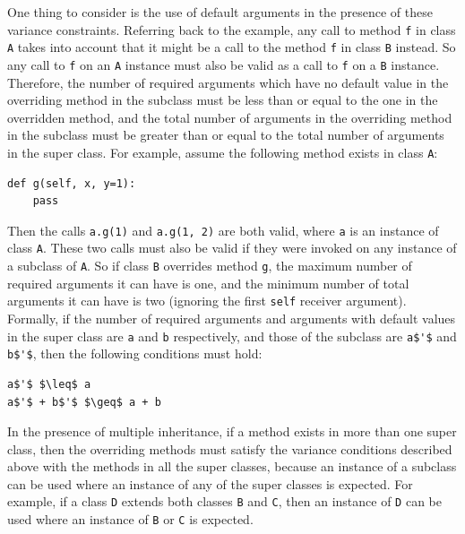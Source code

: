 One thing to consider is the use of default arguments in the presence of these variance constraints. Referring back to the example, any call to method \lstinline|f| in class \lstinline|A| takes into account that it might be a call to the method \lstinline|f| in class \lstinline|B| instead. So any call to \lstinline|f| on an \lstinline|A| instance must also be valid as a call to \lstinline|f| on a \lstinline|B| instance. Therefore, the number of required arguments which have no default value in the overriding method in the subclass must be less than or equal to the one in the overridden method, and the total number of arguments in the overriding method in the subclass must be greater than or equal to the total number of arguments in the super class. For example, assume the following method exists in class \lstinline|A|:
\begin{lstlisting}
def g(self, x, y=1):
	pass
\end{lstlisting}
Then the calls \lstinline|a.g(1)| and \lstinline|a.g(1, 2)| are both valid, where \lstinline|a| is an instance of class \lstinline|A|. These two calls must also be valid if they were invoked on any instance of a subclass of \lstinline|A|. So if class \lstinline|B| overrides method \lstinline|g|, the maximum number of required arguments it can have is one, and the minimum number of total arguments it can have is two (ignoring the first \lstinline|self| receiver argument).\\

Formally, if the number of required arguments and arguments with default values in the super class are \lstinline|a| and \lstinline|b| respectively, and those of the subclass are \lstinline[mathescape]|a$'$| and \lstinline[mathescape]|b$'$|, then the following conditions must hold:
\begin{lstlisting}[mathescape]
a$'$ $\leq$ a 
a$'$ + b$'$ $\geq$ a + b
\end{lstlisting}

In the presence of multiple inheritance, if a method exists in more than one super class, then the overriding methods must satisfy the variance conditions described above with the methods in all the super classes, because an instance of a subclass can be used where an instance of any of the super classes is expected. For example, if a class \lstinline|D| extends both classes \lstinline|B| and \lstinline|C|, then an instance of \lstinline|D| can be used where an instance of \lstinline|B| or \lstinline|C| is expected.


